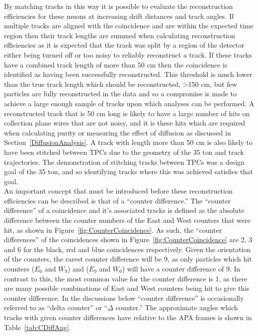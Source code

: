 By matching tracks in this way it is possible to evaluate the reconstruction efficiencies for these muons at increasing drift distances and track angles. If multiple tracks are aligned with the coincidence and are within the expected time region then their track lengths are summed when calculating reconstruction efficiencies as it is expected that the track was split by a region of the detector either being turned off or too noisy to reliably reconstruct a track. If these tracks have a combined track length of more than 50 cm then the coincidence is identified as having been successfully reconstructed. This threshold is much lower than the true track length which should be reconstructed, >150 cm, but few particles are fully reconstructed in the data and so a compromise is made to achieve a large enough sample of tracks upon which analyses can be performed. A reconstructed track that is 50 cm long is likely to have a large number of hits on collection plane wires that are not noisy, and it is these hits which are required when calculating purity or measuring the effect of diffusion as discussed in Section~\ref{DiffusionAnalysis}. A track with length more than 50 cm is also likely to have been stitched between TPCs due to the geometry of the 35 ton and track trajectories. The demonstration of stitching tracks between TPCs was a design goal of the 35 ton, and so identifying tracks where this was achieved satisfies that goal. \\

An important concept that must be introduced before these reconstruction efficiencies can be described is that of a ``counter difference.'' The ``counter difference'' of a coincidence and it's associated tracks is defined as the absolute difference between the counter numbers of the East and West counters that were hit, as shown in Figure~\ref{fig:CounterCoincidence}. As such, the ``counter differences'' of the coincidences shown in Figure~\ref{fig:CounterCoincidence} are 2, 3 and 6 for the black, red and blue coincidences respectively. Given the orientation of the counters, the rarest counter difference will be 9, as only particles which hit counters ($E_0$ and $W_9$) and ($E_9$ and $W_0$) will have a counter difference of 9. In contrast to this, the most common value for the counter difference is 1, as there are many possible combinations of East and West counters being hit to give this counter difference. In the discussions below ``counter difference'' is occasionally referred to as ``delta counter'' or ``$\Delta$ counter.'' The approximate angles which tracks with given counter differences have relative to the APA frames is shown in Table~\ref{tab:CDiffAng}. \\

